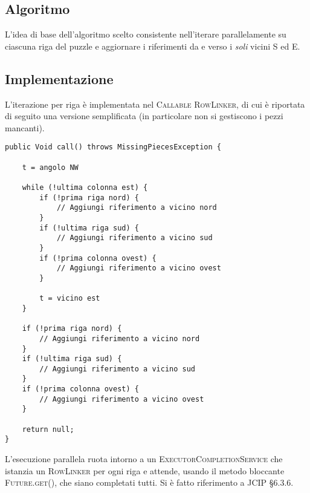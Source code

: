 \documentclass[a4paper]{article}
\newcommand{\Classname}[1]{\textsc{#1}}
\newcommand{\Ifacename}[1]{\textsc{#1}}
\begin{document}
\subsection{Algoritmo}
L'idea di base dell'algoritmo scelto consistente nell'iterare parallelamente su ciascuna riga del puzzle e aggiornare i riferimenti da e verso i \emph{soli} vicini S ed E.

\subsection{Implementazione}
L'iterazione per riga \`e implementata nel \Ifacename{Callable} \Classname{RowLinker}, di cui \`e riportata di seguito una versione semplificata (in particolare non si gestiscono i pezzi mancanti).

\begin{verbatim}
public Void call() throws MissingPiecesException {

	t = angolo NW

	while (!ultima colonna est) {
		if (!prima riga nord) {
			// Aggiungi riferimento a vicino nord
		}
		if (!ultima riga sud) {
			// Aggiungi riferimento a vicino sud
		}
		if (!prima colonna ovest) {
			// Aggiungi riferimento a vicino ovest
		}

		t = vicino est
	}

	if (!prima riga nord) {
		// Aggiungi riferimento a vicino nord
	}
	if (!ultima riga sud) {
		// Aggiungi riferimento a vicino sud
	}
	if (!prima colonna ovest) {
		// Aggiungi riferimento a vicino ovest
	}

	return null;
}
\end{verbatim}

L'esecuzione parallela ruota intorno a un \Classname{ExecutorCompletionService} che istanzia un \Classname{RowLinker} per ogni riga e attende, usando il metodo bloccante \Ifacename{Future.get()}, che siano completati tutti.
Si \`e fatto riferimento a JCIP §6.3.6.
\end{document}

